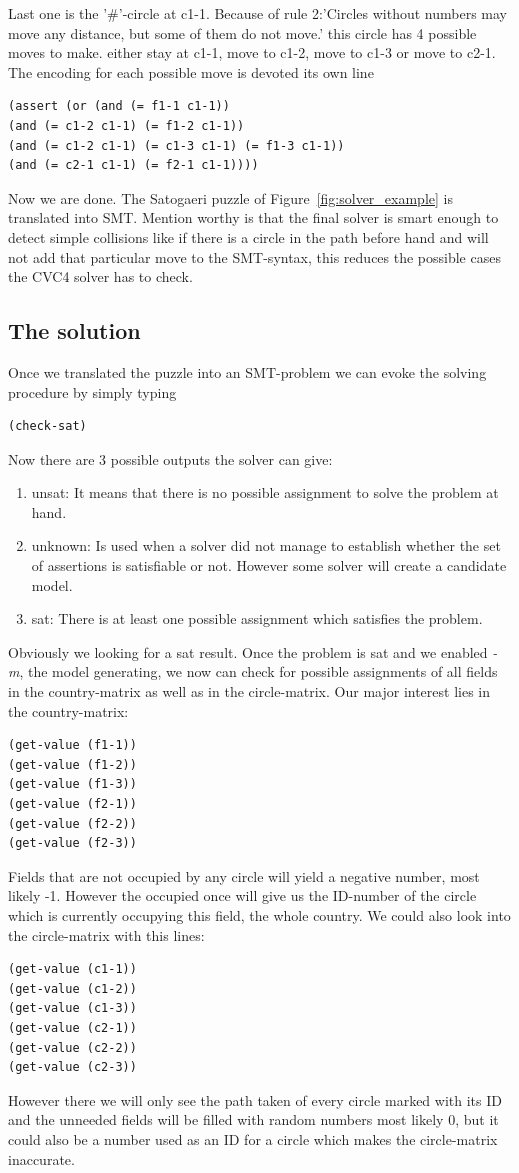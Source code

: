 \documentclass[a4paper,10pt]{paper}
\begin{document}
Last one is the '\#'-circle at c1-1. Because of rule 2:'Circles without numbers may move any distance, but some of them do not move.' this circle has 4 possible moves to make. either stay at c1-1, move to c1-2, move to c1-3 or move to c2-1. The encoding for each possible move is devoted its own line
\begin{lstlisting}
(assert (or (and (= f1-1 c1-1)) 
(and (= c1-2 c1-1) (= f1-2 c1-1))
(and (= c1-2 c1-1) (= c1-3 c1-1) (= f1-3 c1-1)) 
(and (= c2-1 c1-1) (= f2-1 c1-1))))
\end{lstlisting}
Now we are done. The Satogaeri puzzle of Figure~\ref{fig:solver_example} is translated into SMT.
Mention worthy is that the final solver is smart enough to detect simple collisions like if there is a circle in the path before hand and will not add that particular move to the SMT-syntax, this reduces the possible cases the CVC4 solver has to check.

\subsection{The solution}
Once we translated the puzzle into an SMT-problem we can evoke the solving procedure by simply typing
\begin{lstlisting}
(check-sat)
\end{lstlisting}
Now there are 3 possible outputs the solver can give:
\begin{enumerate}
  \item unsat: It means that there is no possible assignment to solve the problem at hand.
  \item unknown: Is used when a solver did not manage to establish whether the set of assertions is satisfiable or not. However some solver will create a candidate model.
  \item sat: There is at least one possible assignment which satisfies the problem.
\end{enumerate}
Obviously we looking for a sat result. Once the problem is sat and we enabled \emph{-m}, the model generating, we now can check for possible assignments of all fields in the country-matrix as well as in the circle-matrix. Our major interest lies in the country-matrix:
\begin{lstlisting}
(get-value (f1-1))
(get-value (f1-2))
(get-value (f1-3))
(get-value (f2-1))
(get-value (f2-2))
(get-value (f2-3))
\end{lstlisting}
Fields that are not occupied by any circle will yield a negative number, most likely -1. However the occupied once will give us the ID-number of the circle which is currently occupying this field, the whole country.
We could also look into the circle-matrix with this lines:
\begin{lstlisting}
(get-value (c1-1))
(get-value (c1-2))
(get-value (c1-3))
(get-value (c2-1))
(get-value (c2-2))
(get-value (c2-3))
\end{lstlisting}
However there we will only see the path taken of every circle marked with its ID and the unneeded fields will be filled with random numbers most likely 0, but it could also be a number used as an ID for a circle which makes the circle-matrix inaccurate.
\end{document}
